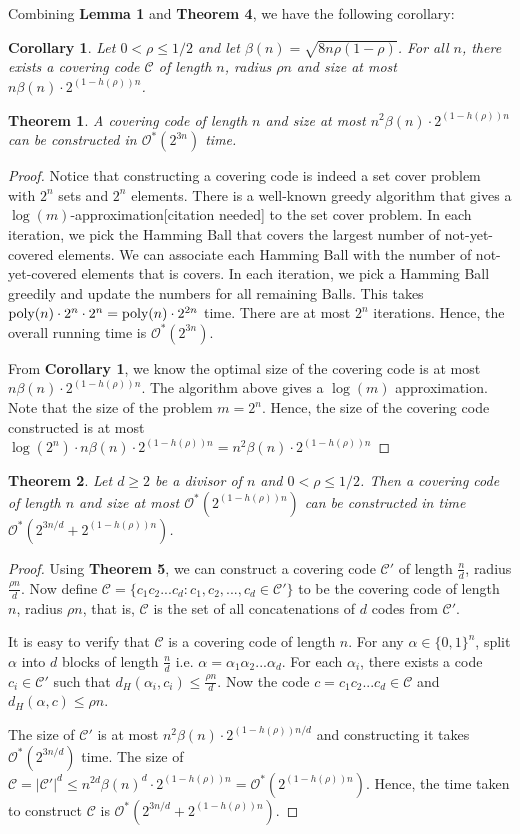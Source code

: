 \documentclass[a4paper,12pts]{article}
\newcommand{\dist}[2]{d_H(#1,#2)}
\newcommand{\cc}{\mathcal{C}}
\newcommand{\bits}{\{0,1\}}
\newcommand{\poly}{\textnormal{poly}}
\renewcommand{\O}{\mathcal{O}^*}
\newtheorem{theorem}{Theorem}
\newtheorem{corollary}{Corollary}
\begin{document}
Combining \textbf{Lemma 1} and \textbf{Theorem 4}, we have the following corollary:
\begin{corollary}
	Let $0 < \rho \leq 1/2$ and let $\beta(n) = \sqrt{8n\rho(1-\rho)}$. For all $n$, there exists a covering code $\cc$ of length $n$, radius $\rho n$ and size at most $n\beta(n)\cdot 2^{(1-h(\rho))n}$.
\end{corollary}
\begin{theorem}
	A covering code of length $n$ and size at most $n^2\beta(n)\cdot 2^{(1-h(\rho))n}$ can be constructed in $\O(2^{3n})$ time.
\end{theorem}
\begin{proof}
	Notice that constructing a covering code is indeed a set cover problem with $2^n$ sets and $2^n$ elements. There is a well-known greedy algorithm that gives a $\log(m)$-approximation[citation needed] to the set cover problem. In each iteration, we pick the Hamming Ball that covers the largest number of not-yet-covered elements. We can associate each Hamming Ball with the number of not-yet-covered elements that is covers. In each iteration, we pick a Hamming Ball greedily and update the numbers for all remaining Balls. This takes $\poly(n) \cdot 2^n \cdot 2^n = \poly(n) \cdot 2^{2n}$ time. There are at most $2^n$ iterations. Hence, the overall running time is $\O(2^{3n})$. \par 
	From \textbf{Corollary 1}, we know the optimal size of the covering code is at most $n\beta(n)\cdot 2^{(1-h(\rho))n}$. The algorithm above gives a $\log(m)$ approximation. Note that the size of the problem $m = 2^n$. Hence, the size of the covering code constructed is at most $\log(2^n) \cdot n\beta(n)\cdot 2^{(1-h(\rho))n} = n^2\beta(n)\cdot 2^{(1-h(\rho))n}$
\end{proof}
\begin{theorem}
	Let $d\geq 2$ be a divisor of $n$ and $0<\rho \leq 1/2$. Then a covering code of length $n$ and size at most $\O(2^{(1-h(\rho))n})$ can be constructed in time $\O(2^{3n/d}+ 2^{(1-h(\rho))n})$.
\end{theorem}
\begin{proof}
	Using \textbf{Theorem 5}, we can construct a covering code $\cc'$ of length $\frac{n}{d}$, radius $\frac{\rho n}{d}$. Now define $\cc = \{c_1c_2...c_d:c_1,c_2,...,c_d \in \cc'\}$ to be the covering code of length $n$, radius $\rho n$, that is, $\cc$ is the set of all concatenations of $d$ codes from $\cc'$.\par 
	It is easy to verify that $\cc$ is a covering code of length $n$. For any $\alpha \in \bits^n$, split $\alpha$ into $d$ blocks of length $\frac{n}{d}$ i.e. $\alpha = \alpha_1\alpha_2...\alpha_d$. For each $\alpha_i$, there exists a code $c_i \in \cc'$ such that $\dist{\alpha_i}{c_i} \leq \frac{\rho n}{d}$. Now the code $c = c_1c_2...c_d \in \cc$ and $\dist{\alpha}{c} \leq \rho n$. \par 
	The size of $\cc'$ is at most $n^2\beta(n)\cdot 2^{(1-h(\rho))n/d}$ and constructing it takes $\O(2^{3n/d})$ time. The size of $\cc = |\cc'|^d \leq n^{2d}\beta(n)^d\cdot 2^{(1-h(\rho))n} = \O(2^{(1-h(\rho))n})$. Hence, the time taken to construct $\cc$ is $\O(2^{3n/d}+ 2^{(1-h(\rho))n})$.
\end{proof}
\end{document}
